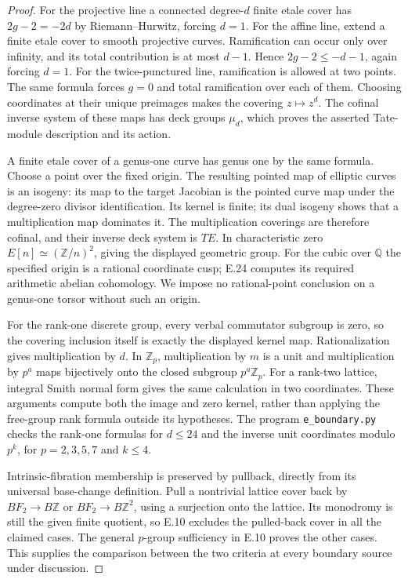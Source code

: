 \begin{proof}
For the projective line a connected degree-$d$ finite etale cover has
$2g-2=-2d$ by Riemann--Hurwitz, forcing $d=1$. For the affine line,
extend a finite etale cover to smooth projective curves. Ramification
can occur only over infinity, and its total contribution is at most
$d-1$. Hence $2g-2\le-d-1$, again forcing $d=1$. For the twice-punctured
line, ramification is allowed at two points. The same formula forces
$g=0$ and total ramification over each of them. Choosing coordinates
at their unique preimages makes the covering $z\mapsto z^d$.
The cofinal inverse system of these maps has deck groups $\mu_d$,
which proves the asserted Tate-module description and its action.

A finite etale cover of a genus-one curve has genus one by the same
formula. Choose a point over the fixed origin. The resulting pointed
map of elliptic curves is an isogeny: its map to the target Jacobian
is the pointed curve map under the degree-zero divisor identification.
Its kernel is finite; its dual isogeny shows that a multiplication
map dominates it. The multiplication coverings are therefore cofinal,
and their inverse deck system is $TE$. In characteristic zero
$E[n]\simeq(\mathbb Z/n)^2$, giving the displayed geometric group.
For the cubic over $\mathbb Q$ the specified origin is a rational
coordinate cusp; E.24 computes its required arithmetic abelian
cohomology. We impose no rational-point conclusion on a genus-one
torsor without such an origin.

For the rank-one discrete group, every verbal commutator subgroup is
zero, so the covering inclusion itself is exactly the displayed
kernel map. Rationalization gives multiplication by $d$.
In $\mathbb Z_p$, multiplication by $m$ is a unit and multiplication
by $p^a$ maps bijectively onto the closed subgroup $p^a\mathbb Z_p$.
For a rank-two lattice, integral Smith normal form gives the same
calculation in two coordinates. These arguments compute both the
image and zero kernel, rather than applying the free-group rank
formula outside its hypotheses. The program \texttt{e\_boundary.py}
checks the rank-one formulas for $d\le24$ and the inverse unit
coordinates modulo $p^k$, for $p=2,3,5,7$ and $k\le4$.

Intrinsic-fibration membership is preserved by pullback, directly
from its universal base-change definition. Pull a nontrivial lattice
cover back by $BF_2\to B\mathbb Z$ or $BF_2\to B\mathbb Z^2$,
using a surjection onto the lattice. Its monodromy is still the
given finite quotient, so E.10 excludes the pulled-back cover in
all the claimed cases. The general $p$-group sufficiency in E.10
proves the other cases. This supplies the comparison between the
two criteria at every boundary source under discussion.


\end{proof}
